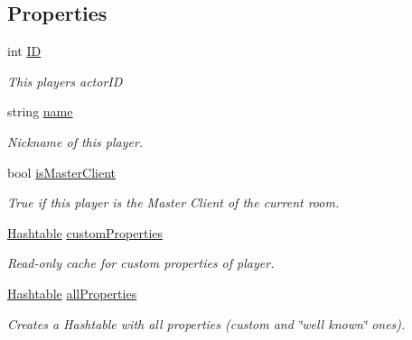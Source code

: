 \subsection*{Properties}
\begin{DoxyCompactItemize}
\item 
int \hyperlink{class_photon_player_ac363d86e7c6ea63573e0ecfda7f7eaa7}{ID}
\begin{DoxyCompactList}\small\item\em This player\textquotesingle{}s actor\+ID\end{DoxyCompactList}\item 
string \hyperlink{class_photon_player_a74e5bb916dbfdb6960b8f2f11fa6aba9}{name}
\begin{DoxyCompactList}\small\item\em Nickname of this player. \end{DoxyCompactList}\item 
bool \hyperlink{class_photon_player_ade88a2875960de99e5ab98fc6db1650c}{is\+Master\+Client}
\begin{DoxyCompactList}\small\item\em True if this player is the Master Client of the current room. \end{DoxyCompactList}\item 
\hyperlink{_extensions_8cs_afa613ef589c02dbd94acc273b62cdcfd}{Hashtable} \hyperlink{class_photon_player_ab7e0bc6125b15524e74b5ac9d7c337d7}{custom\+Properties}
\begin{DoxyCompactList}\small\item\em Read-\/only cache for custom properties of player. \end{DoxyCompactList}\item 
\hyperlink{_extensions_8cs_afa613ef589c02dbd94acc273b62cdcfd}{Hashtable} \hyperlink{class_photon_player_a82ba921802edc4960d075f1deacfb19d}{all\+Properties}
\begin{DoxyCompactList}\small\item\em Creates a Hashtable with all properties (custom and \char`\"{}well known\char`\"{} ones). \end{DoxyCompactList}\end{DoxyCompactItemize}


